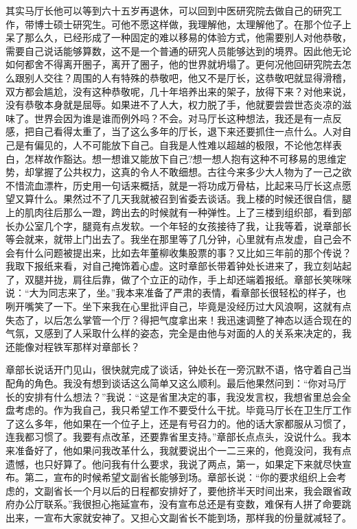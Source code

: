 \documentclass[12pt,oneside]{book}
\begin{document}
其实马厅长他可以等到六十五岁再退休，可以回到中医研究院去做自己的研究工作，带博士硕士研究生。可他不愿这样做，我理解他，太理解他了。在那个位子上呆了那么久，已经形成了一种固定的难以移易的体验方式，他需要别人对他恭敬，需要自己说话能够算数，这不是一个普通的研究人员能够达到的境界。因此他无论如何都舍不得离开圈子，离开了圈子，他的世界就坍塌了。更何况他回研究院去怎么跟别人交往？周围的人有特殊的恭敬吧，他又不是厅长，这恭敬吧就显得滑稽，双方都会尴尬，没有这种恭敬呢，几十年培养出来的架子，放得下来？对他来说，没有恭敬本身就是屈辱。如果进不了人大，权力脱了手，他就要尝尝世态炎凉的滋味了。世界会因为谁是谁而例外吗？不会。对马厅长这种想法，我还是有一点反感，把自己看得太重了，当了这么多年的厅长，退下来还要抓住一点什么。人对自己是有偏见的，人不可能放下自己。自我是人性难以超越的极限，不论他怎样表白，怎样故作豁达。想一想谁又能放下自己?想一想人抱有这种不可移易的思维定势，却掌握了公共权力，这真的令人不敢细想。古往今来多少大人物为了一己之欲不惜流血漂杵，历史用一句话来概括，就是一将功成万骨枯，比起来马厅长这点愿望又算什么。果然过不了几天我就被召到省委去谈话。我上楼的时候还很自信，腿上的肌肉往后那么一蹬，跨出去的时候就有一种弹性。上了三楼到组织部，看到部长办公室几个字，腿竟有点发软。一个年轻的女孩接待了我，让我等着，说章部长等会就来，就带上门出去了。我坐在那里等了几分钟，心里就有点发虚，自己会不会有什么问题被提出来，比如去年董柳收集股票的事？又比如三年前的那个传说？我取下报纸来看，对自己掩饰着心虚。这时章部长带着钟处长进来了，我立刻站起了，双腿并拢，肩往后靠，做了个立正的动作，手上却还端着报纸。章部长笑咪咪说：``大为同志来了，坐。''我本来准备了严肃的表情，看章部长很轻松的样子，也咧开嘴笑了一下。坐下来我在心里批评自己，毕竟是没经历过大风浪啊，这就有点失态了，以后怎么掌管一个厅？得把气度拿出来！我迅速调整了神态以适合现在的气氛，又感到了人采取什么样的姿态，完全是由他与对面的人的关系来决定的，我还能像对程铁军那样对章部长？

章部长说话开门见山，很快就完成了谈话，钟处长在一旁沉默不语，恪守着自己当配角的角色。我没有想到谈话这么简单又这么顺利。最后他果然问到：``你对马厅长的安排有什么想法？''我说：``这是省里决定的事，我没发言权，我想省里总会全盘考虑的。作为我自己，我只希望工作不要受什么干扰。毕竟马厅长在卫生厅工作了这么多年，他如果在一个位子上，还是有号召力的。他的话大家都服从习惯了，连我都习惯了。我要有点改革，还要靠省里支持。''章部长点点头，没说什么。我本来准备好了，他如果问我改革什么，我就要说出个一二三来的，他竟没问，我有点遗憾，也只好算了。他问我有什么要求，我说了两点，第一，如果定下来就尽快宣布。第二，宣布的时候希望文副省长能够到场。章部长说：``你的要求组织上会考虑的，文副省长一个月以后的日程都安排好了，要他挤半天时间出来，我会跟省政府办公厅联系。''我很担心拖延宣布，没有宣布总还是有变数，难保有人拼了命要跳出来，一宣布大家就安神了。又担心文副省长不能到场，那样我的份量就减轻了。
\end{document}
